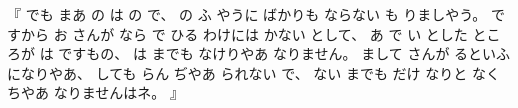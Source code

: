 %
『
でも
まあ
の
は
の
で、
%
の
ふ
やうに
ばかりも
ならない
も
りましやう。
%
ですから
お
さんが
なら
で
%
ひる
わけには
かない
として、
%
あ
で
い
とした
ところが
は
ですもの、
%
は
までも
なけりやあ
なりません。
%
まして
さんが
るといふ
になりやあ、
%
しても
らん
ぢやあ
られない
で、
%
ない
までも
だけ
なりと
なくちやあ
なりませんはネ。
』
